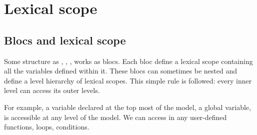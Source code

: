 %
%
%






\section{Lexical scope}\label{section:variable_scope}

\subsection{Blocs and lexical scope}

Some structure as , , ,  works as blocs.
Each bloc define a lexical scope containing all the variables defined within it.
These blocs can sometimes be nested and define a level hierarchy of lexical scopes.
This simple rule is followed: every inner level can access its outer levels.

For example, a variable  declared at the top most of the model, a global variable, is accessible at any level of the model.
We can access  in any user-defined functions, loops, conditions.

